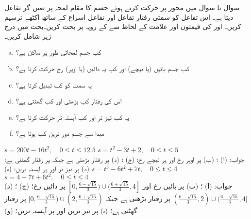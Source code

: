 سوال  تا سوال  میں  محور پر حرکت کرتے ہوئے جسم کا مقام  لمحہ  پر تعین گر تفاعل  دیتا ہے۔ اس تفاعل کو سمتی رفتار تفاعل
  اور تفاعل اسراع  کے ساتھ اکٹھے ترسیم کریں۔ اور  کی قیمتوں اور علامت کے لحاظ سے  کے رویہ پر بحث کریں۔بحث میں درج زیر شامل کریں۔
\begin{enumerate}[a.]
\item
کب جسم لمحاتی طور پر ساکن ہے؟
\item
کب جسم بائیں (یا نیچے) اور کب یہ دائیں (یا اوپر) رخ حرکت کرتا ہے؟
\item
یہ سمت کو کب تبدیل کرتا ہے؟
\item
اس کی رفتار کب بڑھتی اور کب گھٹتی ہے؟
\item
یہ کب تیز تر اور کب آہستہ تر حرکت کرتا ہے؟
\item
مبدا سے جسم دور ترین کب ہوتا ہے؟ 
\end{enumerate}

$s=200t-16t^2,\quad 0\le t\le 12.5$
$s=t^2-3t+2,\quad 0\le t\le 5$\\
جواب:\quad
(ا) ؛ (ب) \عددی{[ 0,6.25)} پر اوپر رخ اور \عددی{(6.25,12.5]} پر نیچے رخ؛ (ج) ؛ (د) \عددی{(6.25,12.5]} پر رفتار بڑھتی ہے جبکہ \عددی{[ 0,6.25)} پر رفتار گھٹتی ہے؛ (د)  پر تیز تر اور  پر آہستہ ترین؛ (ہ) 
$s=t^3-6t^2+7t,\quad 0\le t\le 4$
$s=4-7t+6t^2,\quad 0\le t\le 4$\\
جواب:\quad 
(ا) ؛  (ب)  پر بائیں رخ  اور 
$[0,\tfrac{6-\sqrt{15}}{3})\cup(\tfrac{6+\sqrt{15}}{3},4]$
 پر دائیں رخ؛ (ج) ؛ (د) 
$(\tfrac{6-\sqrt{15}}{3},2)\cup (\tfrac{6+\sqrt{15}}{3},4]$
پر رفتار بڑھتی ہے جبکہ 
$[0,\tfrac{6-\sqrt{15}}{3})\cup (2,\tfrac{6+\sqrt{15}}{3})$
 پر رفتار گھٹتی ہے؛ (ہ)  پر تیز ترین اور  پر آہستہ ترین؛ (و) 



